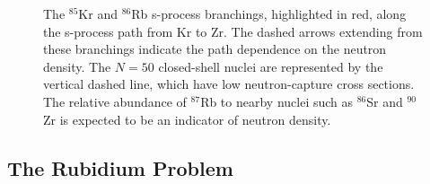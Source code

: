 \begin{figure}[t]
\caption{\label{fig:Rb86Branch}The $^{85}$Kr and $^{86}$Rb s-process branchings, highlighted in red, along the s-process path from Kr to Zr. The dashed arrows extending from these branchings indicate the path dependence on the neutron density. The $N=50$ closed-shell nuclei are represented by the vertical dashed line, which have low neutron-capture cross sections. The relative abundance of $^{87}$Rb to nearby nuclei such as $^{86}$Sr and $^{90}$Zr is expected to be an indicator of neutron density.}
\end{figure}

\subsection{The Rubidium Problem} \label{subsec:Rb_Problem}








